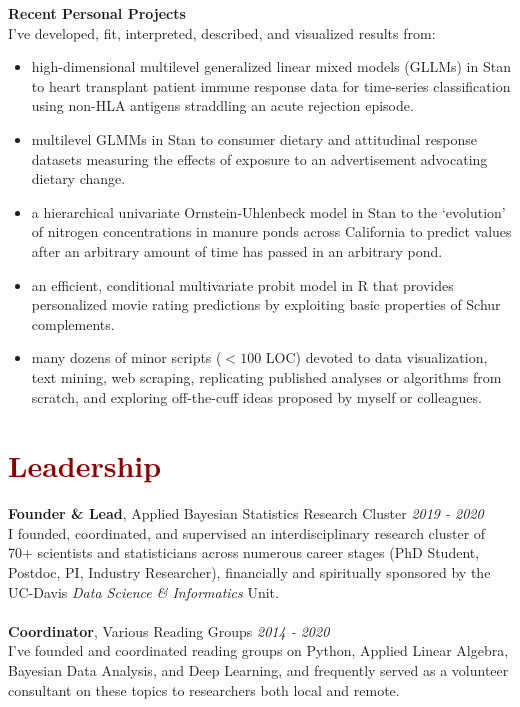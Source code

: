 \documentclass[11pt,margin,line]{resume}
\begin{document}
\begin{resume}
    \textbf{Recent Personal Projects}\\
I've developed, fit, interpreted, described, and visualized results from:
\begin{itemize}[noitemsep]

\item high-dimensional multilevel generalized linear mixed models (GLLMs) in Stan to heart transplant patient immune response data for time-series classification using non-HLA antigens straddling an acute rejection episode.
\item multilevel GLMMs in Stan to consumer dietary and attitudinal response datasets measuring the effects of exposure to an advertisement advocating dietary change.
\item a hierarchical univariate Ornstein-Uhlenbeck model in Stan to the `evolution' of nitrogen concentrations in manure ponds across California to predict values after an arbitrary amount of time has passed in an arbitrary pond.
\item an efficient, conditional multivariate probit model in R that provides personalized movie rating predictions by exploiting basic properties of Schur complements.
\item many dozens of minor scripts ($<100$ LOC) devoted to data visualization, text mining, web scraping, replicating published analyses or algorithms from scratch, and exploring off-the-cuff ideas proposed by myself or colleagues.

\end{itemize}

\vspace{-1.5mm}
\section{\large\textcolor{DarkRed}{Leadership}}

\textbf{Founder \& Lead}, Applied Bayesian Statistics Research Cluster \hfill \emph{2019 - 2020}\\
I founded, coordinated, and supervised an interdisciplinary research cluster of 70+ scientists and statisticians across numerous career stages (PhD Student, Postdoc, PI, Industry Researcher), financially and spiritually sponsored by the UC-Davis \emph{Data Science \& Informatics} Unit.\\\\
\textbf{Coordinator}, Various Reading Groups \hfill \emph{2014 - 2020}\\
I've founded and coordinated reading groups on Python, Applied Linear Algebra, Bayesian Data Analysis, and Deep Learning, and frequently served as a volunteer consultant on these topics to researchers both local and remote.


\end{resume}
\end{document}
